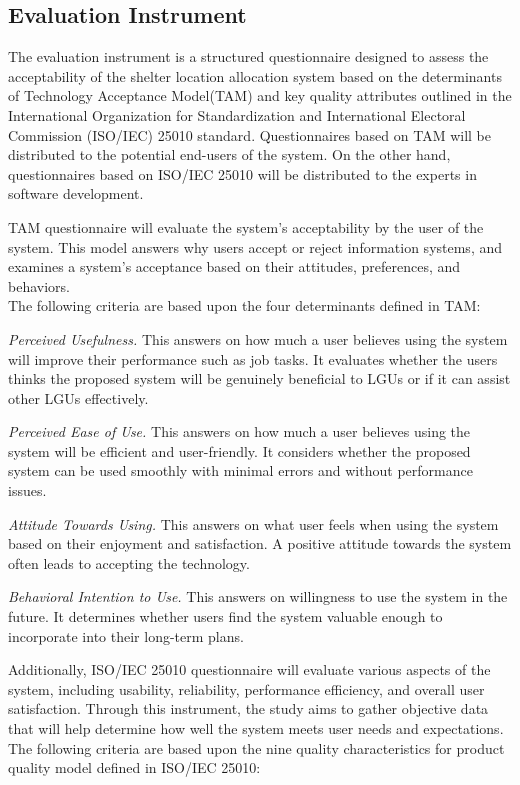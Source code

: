 \subsection{Evaluation Instrument}
	The evaluation instrument is a structured questionnaire designed to assess the acceptability of the shelter location allocation system based on the determinants of Technology Acceptance Model(TAM) and key quality attributes outlined in the International Organization for Standardization and International Electoral Commission (ISO/IEC) 25010 standard. Questionnaires based on TAM will be distributed to the potential end-users of the system. On the other hand, questionnaires based on ISO/IEC 25010 will be distributed to the experts in software development.
	
	TAM questionnaire will evaluate the system's acceptability by the user of the system. This model answers why users accept or reject information systems, and examines a system's acceptance based on their attitudes, preferences, and behaviors.\parencite{Davis1987}
	\\The following criteria are based upon the four determinants defined in TAM:
	
	\textit{Perceived Usefulness.} This answers on how much a user believes using the system will improve their performance such as job tasks. It evaluates whether the users thinks the proposed system will be genuinely beneficial to LGUs or if it can assist other LGUs effectively.
	
	\textit{Perceived Ease of Use.} This answers on how much a user believes using the system will be efficient and user-friendly. It considers whether the proposed system can be used smoothly with minimal errors and without performance issues.
	
	\textit{Attitude Towards Using.} This answers on what user feels when using the system based on their enjoyment and satisfaction. A positive attitude towards the system often leads to accepting the technology.
	
	\textit{Behavioral Intention to Use.} This answers on willingness to use the system in the future. It determines whether users find the system valuable enough to incorporate into their long-term plans.
	
	Additionally, ISO/IEC 25010 questionnaire will evaluate various aspects of the system, including usability, reliability, performance efficiency, and overall user satisfaction. Through this instrument, the study aims to gather objective data that will help determine how well the system meets user needs and expectations. \parencite{ISOIEC2023}
	\\The following criteria are based upon the nine quality characteristics for product quality model defined in ISO/IEC 25010:
	
